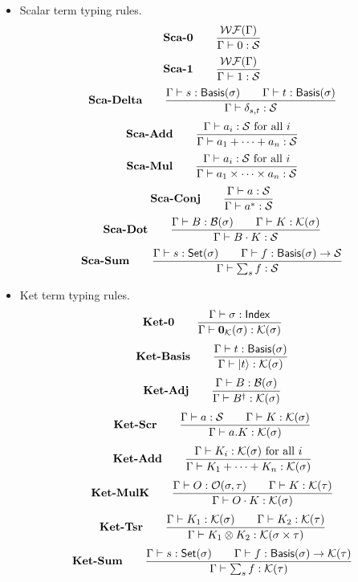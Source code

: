 \begin{itemize}
    \item Scalar term typing rules.
    \[
        \textbf{Sca-0} \qquad
        \frac{\mathcal{WF}(\Gamma)}{\Gamma \vdash 0 : \mathcal{S}}
    \]
    \[
        \textbf{Sca-1} \qquad
        \frac{\mathcal{WF}(\Gamma)}{\Gamma \vdash 1 : \mathcal{S}}
    \]
    \[
        \textbf{Sca-Delta} \qquad
        \frac{ \Gamma\vdash s : \mathsf{Basis}(\sigma) \qquad \Gamma\vdash t : \mathsf{Basis}(\sigma) } {\Gamma \vdash \delta_{s, t} : \mathcal{S}}
    \]
    \[
        \textbf{Sca-Add} \qquad
        \frac{\Gamma\vdash a_i : \mathcal{S} \text{ for all $i$}}{\Gamma\vdash a_1 + \cdots + a_n : \mathcal{S}}
    \]
    \[
        \textbf{Sca-Mul} \qquad
        \frac{\Gamma\vdash a_i : \mathcal{S} \text{ for all $i$}}{\Gamma\vdash a_1 \times \cdots \times a_n : \mathcal{S}}
    \]
    \[
        \textbf{Sca-Conj} \qquad
        \frac{\Gamma \vdash a : \mathcal{S}}{\Gamma \vdash a^*:\mathcal{S}}
    \]
    \[
        \textbf{Sca-Dot} \qquad
        \frac{\Gamma\vdash B : \mathcal{B}(\sigma) \qquad \Gamma\vdash K : \mathcal{K}(\sigma)}{\Gamma \vdash B \cdot K : \mathcal{S}}
    \]
    \[
        \textbf{Sca-Sum} \qquad
        \frac{\Gamma \vdash s : \mathsf{Set}(\sigma) \qquad \Gamma \vdash f : \mathsf{Basis}(\sigma) \to \mathcal{S}}{\Gamma \vdash \sum_{s} f : \mathcal{S}}
    \]

    \item Ket term typing rules.
    \[
        \textbf{Ket-0} \qquad
        \frac{\Gamma \vdash \sigma : \mathsf{Index}}{\Gamma \vdash \mathbf{0}_\mathcal{K}(\sigma) : \mathcal{K}(\sigma)}
    \]
    \[
        \textbf{Ket-Basis} \qquad
        \frac{\Gamma\vdash t : \mathsf{Basis}(\sigma)}{\Gamma \vdash \ket{t} : \mathcal{K}(\sigma)}
    \]
    \[
        \textbf{Ket-Adj} \qquad
        \frac{\Gamma \vdash B : \mathcal{B}(\sigma)}{\Gamma \vdash B^\dagger : \mathcal{K}(\sigma)}
    \]
    \[
        \textbf{Ket-Scr} \qquad
        \frac{\Gamma \vdash a : \mathcal{S} \qquad \Gamma \vdash K : \mathcal{K}(\sigma)}{\Gamma \vdash a.K : \mathcal{K}(\sigma)}
    \]
    \[
        \textbf{Ket-Add} \qquad
        \frac{\Gamma \vdash K_i : \mathcal{K}(\sigma) \text{ for all $i$}}{\Gamma \vdash K_1 + \cdots + K_n : \mathcal{K}(\sigma)}
    \]
    \[
        \textbf{Ket-MulK} \qquad
        \frac{\Gamma \vdash O : \mathcal{O}(\sigma, \tau) \qquad \Gamma \vdash K : \mathcal{K}(\tau)}{\Gamma \vdash O \cdot K : \mathcal{K}(\sigma)}
    \]
    \[
        \textbf{Ket-Tsr} \qquad
        \frac{\Gamma \vdash K_1 : \mathcal{K}(\sigma) \qquad \Gamma \vdash K_2 : \mathcal{K}(\tau)} {\Gamma \vdash K_1 \otimes K_2 : \mathcal{K}(\sigma \times \tau)}
    \]
    \[
        \textbf{Ket-Sum} \qquad
        \frac{\Gamma \vdash s : \mathsf{Set}(\sigma) \qquad \Gamma \vdash f : \mathsf{Basis}(\sigma) \to \mathcal{K}(\tau)}{\Gamma \vdash \sum_{s} f : \mathcal{K}(\tau)}
    \]


\end{itemize}
